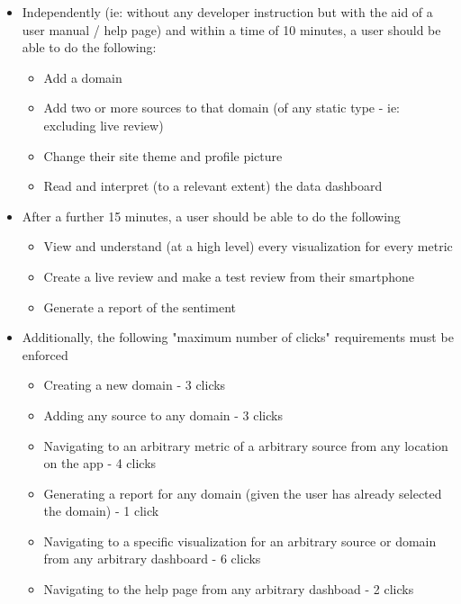 \documentclass[12pt]{article}
\begin{document}
\begin{itemize}
    \item Independently (ie: without any developer instruction but with the aid of a user manual / help page) and within a time of 10 minutes, a user should be able to do the following: \begin{itemize}
        \item Add a domain
        \item Add two or more sources to that domain (of any static type - ie: excluding live review)
        \item Change their site theme and profile picture
        \item Read and interpret (to a relevant extent) the data dashboard
    \end{itemize}
    \item After a further 15 minutes, a user should be able to do the following \begin{itemize}
        \item View and understand (at a high level) every visualization for every metric
        \item Create a live review and make a test review from their smartphone
        \item Generate a report of the sentiment
    \end{itemize}
    \item Additionally, the following "maximum number of clicks" requirements must be enforced \begin{itemize}
        \item Creating a new domain - 3 clicks
        \item Adding any source to any domain - 3 clicks
        \item Navigating to an arbitrary metric of a arbitrary source from any location on the app - 4 clicks
        \item Generating a report for any domain (given the user has already selected the domain) - 1 click
        \item Navigating to a specific visualization for an arbitrary source or domain from any arbitrary dashboard - 6 clicks
        \item Navigating to the help page from any arbitrary dashboad - 2 clicks
    \end{itemize}
\end{itemize}
\end{document}
